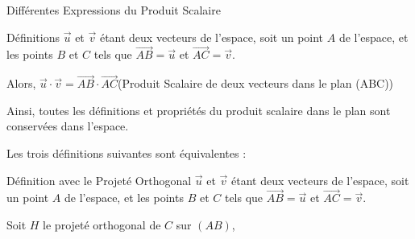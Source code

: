 \documentclass{coursbook}
\begin{document}
    \begin{Gpartie}{Différentes Expressions du Produit Scalaire} 
        \vspace{-2ex}
        \begin{Spartie}{Définitions} 
            $\vec{u}$ et $\vec{v}$ étant deux vecteurs de l'espace, soit un point $A$ de l'espace, et les points $B$ et $C$ tels que $\overrightarrow{AB}=\vec{u}$ et $\overrightarrow{AC}=\vec{v}$.

            Alors, $\vec{u}\cdot\vec{v}=\overrightarrow{AB}\cdot\overrightarrow{AC}$\quad(Produit Scalaire de deux vecteurs dans le plan (ABC))

            Ainsi, toutes les définitions et propriétés du produit scalaire dans le plan sont conservées dans l'espace.

            Les trois définitions suivantes sont équivalentes :
            \begin{SSpartie}{Définition avec le Projeté Orthogonal} 
                $\vec{u}$ et $\vec{v}$ étant deux vecteurs de l'espace, soit un point $A$ de l'espace, et les points $B$ et $C$ tels que $\overrightarrow{AB}=\vec{u}$ et $\overrightarrow{AC}=\vec{v}$.

                Soit $H$ le projeté orthogonal de $C$ sur $(AB)$,


\end{SSpartie}
\end{Spartie}
\end{Gpartie}
\end{document}

